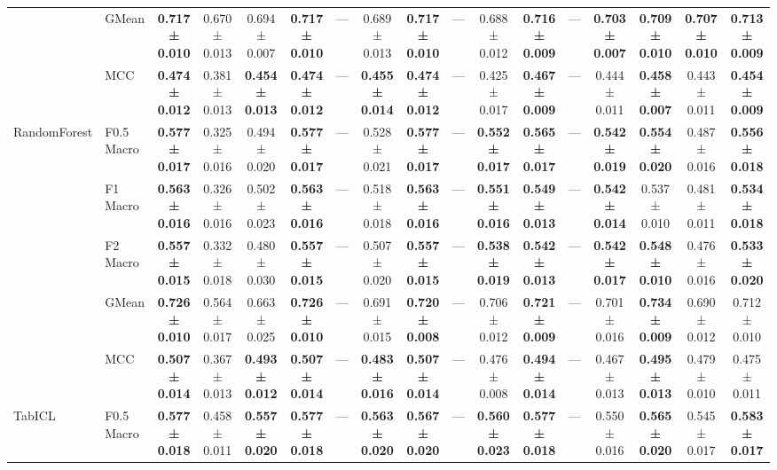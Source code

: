 \begin{table}[H]
{\begin{tabular}{llccccccccccccccc}
 & GMean & \textbf{0.717 ± 0.010} & 0.670 ± 0.013 & 0.694 ± 0.007 & \textbf{0.717 ± 0.010} & — & 0.689 ± 0.013 & \textbf{0.717 ± 0.010} & — & 0.688 ± 0.012 & \textbf{0.716 ± 0.009} & — & \textbf{0.703 ± 0.007} & \textbf{0.709 ± 0.010} & \textbf{0.707 ± 0.010} & \textbf{0.713 ± 0.009} \\
 & MCC & \textbf{0.474 ± 0.012} & 0.381 ± 0.013 & \textbf{0.454 ± 0.013} & \textbf{0.474 ± 0.012} & — & \textbf{0.455 ± 0.014} & \textbf{0.474 ± 0.012} & — & 0.425 ± 0.017 & \textbf{0.467 ± 0.009} & — & 0.444 ± 0.011 & \textbf{0.458 ± 0.007} & 0.443 ± 0.011 & \textbf{0.454 ± 0.009} \\
\cline{1-17}
\multirow[t]{5}{*}{RandomForest} & F0.5 Macro & \textbf{0.577 ± 0.017} & 0.325 ± 0.016 & 0.494 ± 0.020 & \textbf{0.577 ± 0.017} & — & 0.528 ± 0.021 & \textbf{0.577 ± 0.017} & — & \textbf{0.552 ± 0.017} & \textbf{0.565 ± 0.017} & — & \textbf{0.542 ± 0.019} & \textbf{0.554 ± 0.020} & 0.487 ± 0.016 & \textbf{0.556 ± 0.018} \\
 & F1 Macro & \textbf{0.563 ± 0.016} & 0.326 ± 0.016 & 0.502 ± 0.023 & \textbf{0.563 ± 0.016} & — & 0.518 ± 0.018 & \textbf{0.563 ± 0.016} & — & \textbf{0.551 ± 0.016} & \textbf{0.549 ± 0.013} & — & \textbf{0.542 ± 0.014} & 0.537 ± 0.010 & 0.481 ± 0.011 & \textbf{0.534 ± 0.018} \\
 & F2 Macro & \textbf{0.557 ± 0.015} & 0.332 ± 0.018 & 0.480 ± 0.030 & \textbf{0.557 ± 0.015} & — & 0.507 ± 0.020 & \textbf{0.557 ± 0.015} & — & \textbf{0.538 ± 0.019} & \textbf{0.542 ± 0.013} & — & \textbf{0.542 ± 0.017} & \textbf{0.548 ± 0.010} & 0.476 ± 0.016 & \textbf{0.533 ± 0.020} \\
 & GMean & \textbf{0.726 ± 0.010} & 0.564 ± 0.017 & 0.663 ± 0.025 & \textbf{0.726 ± 0.010} & — & 0.691 ± 0.015 & \textbf{0.720 ± 0.008} & — & 0.706 ± 0.012 & \textbf{0.721 ± 0.009} & — & 0.701 ± 0.016 & \textbf{0.734 ± 0.009} & 0.690 ± 0.012 & 0.712 ± 0.010 \\
 & MCC & \textbf{0.507 ± 0.014} & 0.367 ± 0.013 & \textbf{0.493 ± 0.012} & \textbf{0.507 ± 0.014} & — & \textbf{0.483 ± 0.016} & \textbf{0.507 ± 0.014} & — & 0.476 ± 0.008 & \textbf{0.494 ± 0.014} & — & 0.467 ± 0.013 & \textbf{0.495 ± 0.013} & 0.479 ± 0.010 & 0.475 ± 0.011 \\
\cline{1-17}
\multirow[t]{5}{*}{TabICL} & F0.5 Macro & \textbf{0.577 ± 0.018} & 0.458 ± 0.011 & \textbf{0.557 ± 0.020} & \textbf{0.577 ± 0.018} & — & \textbf{0.563 ± 0.020} & \textbf{0.567 ± 0.020} & — & \textbf{0.560 ± 0.023} & \textbf{0.577 ± 0.018} & — & 0.550 ± 0.016 & \textbf{0.565 ± 0.020} & 0.545 ± 0.017 & \textbf{0.583 ± 0.017} \\

\end{tabular}}
\end{table}
